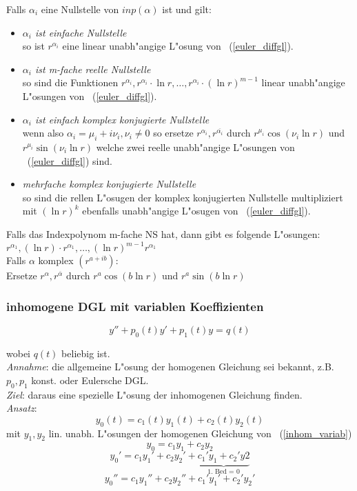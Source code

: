 \documentclass[german, 10pt, a4paper, twocolumn]{scrartcl}
\theoremstyle{definition}
\begin{document}
Falls $\alpha_i$ eine Nullstelle von $inp(\alpha)$ ist und gilt:
\begin{itemize}
 \item \textit{$\alpha_i$ ist einfache Nullstelle}\\
  so ist $r^{\alpha_i}$ eine linear unabh"angige L"osung von ~(\ref{euler_diffgl}).
 \item \textit{$\alpha_i$ ist m-fache reelle Nullstelle}\\
  so sind die Funktionen $r^{\alpha_i},r^{\alpha_i}\cdotp\ln r,\ldots,r^{\alpha_i}\cdotp(\ln r)^{m-1}$ linear unabh"angige L"osungen von ~(\ref{euler_diffgl}).
 \item \textit{$\alpha_i$ ist einfach komplex konjugierte Nullstelle}\\
  wenn also $\alpha_i=\mu_i + i\nu_i, \nu_i\neq 0$ so ersetze $r^{\alpha_i}, r^{\overline{\alpha_i}}$ durch $r^{\mu_i}\cos(\nu_i\ln r)$ und $r^{\mu_i}\sin(\nu_i \ln r)$ welche zwei reelle unabh"angige L"osungen von ~(\ref{euler_diffgl}) sind.\\
 \item \textit{mehrfache komplex konjugierte Nullstelle}\\
  so sind die rellen L"osugen der komplex konjugierten Nullstelle multipliziert mit $(\ln r)^k$ ebenfalls unabh"angige L"osugen von ~(\ref{euler_diffgl}).
\end{itemize}

Falls das Indexpolynom m-fache NS hat, dann gibt es folgende L"osungen:\\
$r^{\alpha_1},(\ln r)\cdotp r^{\alpha_1},\ldots,(\ln r)^{m-1}r^{\alpha_1}$\\

Falls $\alpha$ komplex $(r^{a+ib})$:\\
Ersetze $r^\alpha, r^{\overline{\alpha}}$ durch $r^a\cos(b\ln r)$ und $r^a\sin(b \ln r)$

\subsubsection{inhomogene DGL mit variablen Koeffizienten}

\begin{equation}
 \label{inhom_variab}
 y''+p_0(t)y'+p_1(t)y=q(t)
\end{equation}

wobei $q(t)$ beliebig ist.\\

\textit{Annahme}: die allgemeine L"osung der homogenen Gleichung sei bekannt, z.B. $p_0,p_1$ konst. oder Eulersche DGL.\\
\textit{Ziel}: daraus eine spezielle L"osung der inhomogenen Gleichung finden.\\
\textit{Ansatz}:
$$y_0(t)=c_1(t)y_1(t)+c_2(t)y_2(t)$$
mit $y_1,y_2$ lin. unabh. L"osungen der homogenen Gleichung von ~(\ref{inhom_variab})
$$y_0=c_1y_1+c_2y_2$$
$$y_0'=c_1y_1'+c_2y_2'+\underbrace{c_1'y_1+c_2'y2}_{\mbox{1. Bed = 0}}$$
$$y_0''=c_1y_1''+c_2y_2''+c_1'y_1'+c_2'y_2'$$
\end{document}
